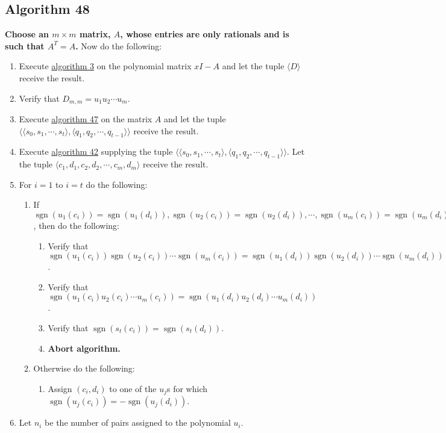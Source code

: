 \documentclass[twocolumn]{article}
\DeclareMathOperator{\sgn}{sgn}
\begin{document}
		\subsection{Algorithm 48}\label{sec:algorithm 48}
			\textbf{Choose an $m\times m$ matrix, $A$, whose entries are only rationals and is such that $A^T=A$.} Now do the following:
			\begin{enumerate}
				\item Execute \hyperref[sec:algorithm 3]{algorithm 3} on the polynomial matrix $xI-A$ and let the tuple $\langle D\rangle$ receive the result.
				\item Verify that $D_{m,m}=u_1u_2\cdots u_m$.
				\item Execute \hyperref[sec:algorithm 47]{algorithm 47} on the matrix $A$ and let the tuple $\langle \langle s_0,s_1,\cdots,s_t\rangle,\langle q_1,q_2,\cdots,q_{t-1}\rangle\rangle$ receive the result.
				\item Execute \hyperref[sec:algorithm 42]{algorithm 42} supplying the tuple $\langle \langle s_0,s_1,\cdots,s_t\rangle,\langle q_1,q_2,\cdots,q_{t-1}\rangle\rangle$. Let the tuple $\langle c_1,d_1,c_2,d_2,\cdots,c_m,d_m\rangle$ receive the result.
				\item For $i=1$ to $i=t$ do the following:
				\begin{enumerate}
					\item If $\sgn(u_1(c_i))=\sgn(u_1(d_i)), \sgn(u_2(c_i))=\sgn(u_2(d_i)), \cdots, \sgn(u_m(c_i))=\sgn(u_m(d_i))$, then do the following:
					\begin{enumerate}
						\item Verify that $\sgn(u_1(c_i))\sgn(u_2(c_i))\cdots\sgn(u_m(c_i))=\sgn(u_1(d_i))\sgn(u_2(d_i))\cdots\sgn(u_m(d_i))$.
						\item Verify that $\sgn(u_1(c_i)u_2(c_i)\cdots u_m(c_i))=\sgn(u_1(d_i)u_2(d_i)\cdots u_m(d_i))$.
						\item Verify that $\sgn(s_t(c_i))=\sgn(s_t(d_i))$.
						\item \textbf{Abort algorithm.}
					\end{enumerate}
					\item Otherwise do the following:
					\begin{enumerate}
						\item Assign $(c_i,d_i)$ to one of the $u_j$s for which $\sgn(u_j(c_i))=-\sgn(u_j(d_i))$.
					\end{enumerate}
				\end{enumerate}
				\item Let $n_i$ be the number of pairs assigned to the polynomial $u_i$.

\end{enumerate}
\end{document}
